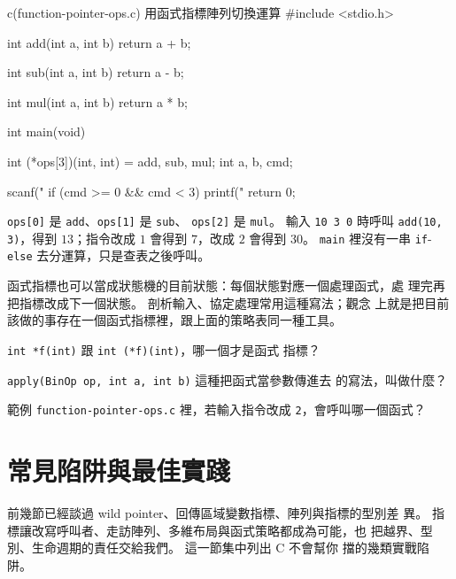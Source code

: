 \begin{example}{c}{(function-pointer-ops.c) 用函式指標陣列切換運算}
#include <stdio.h>

int add(int a, int b) {
    return a + b;
}

int sub(int a, int b) {
    return a - b;
}

int mul(int a, int b) {
    return a * b;
}

int main(void) {
    int (*ops[3])(int, int) = {add, sub, mul};
    int a, b, cmd;

    scanf("%
    if (cmd >= 0 && cmd < 3) {
        printf("%
    }
    return 0;
}
\end{example}


\texttt{ops[0]} 是 \texttt{add}、\texttt{ops[1]} 是 \texttt{sub}、
\texttt{ops[2]} 是 \texttt{mul}。 輸入 \texttt{10 3 0} 時呼叫
\texttt{add(10, 3)}，得到 $13$；指令改成 $1$ 會得到 $7$，改成 $2$
會得到 $30$。 \texttt{main} 裡沒有一串 \texttt{if}-\texttt{else}
去分運算，只是查表之後呼叫。

函式指標也可以當成狀態機的目前狀態：每個狀態對應一個處理函式，處
理完再把指標改成下一個狀態。 剖析輸入、協定處理常用這種寫法；觀念
上就是把目前該做的事存在一個函式指標裡，跟上面的策略表同一種工具。


\begin{drills}[label=drills:ptr-funcptr]
\item \texttt{int *f(int)} 跟 \texttt{int (*f)(int)}，哪一個才是函式
指標？
\item \texttt{apply(BinOp op, int a, int b)} 這種把函式當參數傳進去
的寫法，叫做什麼？
\item 範例 \texttt{function-pointer-ops.c} 裡，若輸入指令改成
\texttt{2}，會呼叫哪一個函式？
\end{drills}

\section{常見陷阱與最佳實踐}
\label{sec:ptr-pitfalls}

前幾節已經談過 wild pointer、回傳區域變數指標、陣列與指標的型別差
異。 指標讓改寫呼叫者、走訪陣列、多維布局與函式策略都成為可能，也
把越界、型別、生命週期的責任交給我們。 這一節集中列出 C 不會幫你
擋的幾類實戰陷阱。

